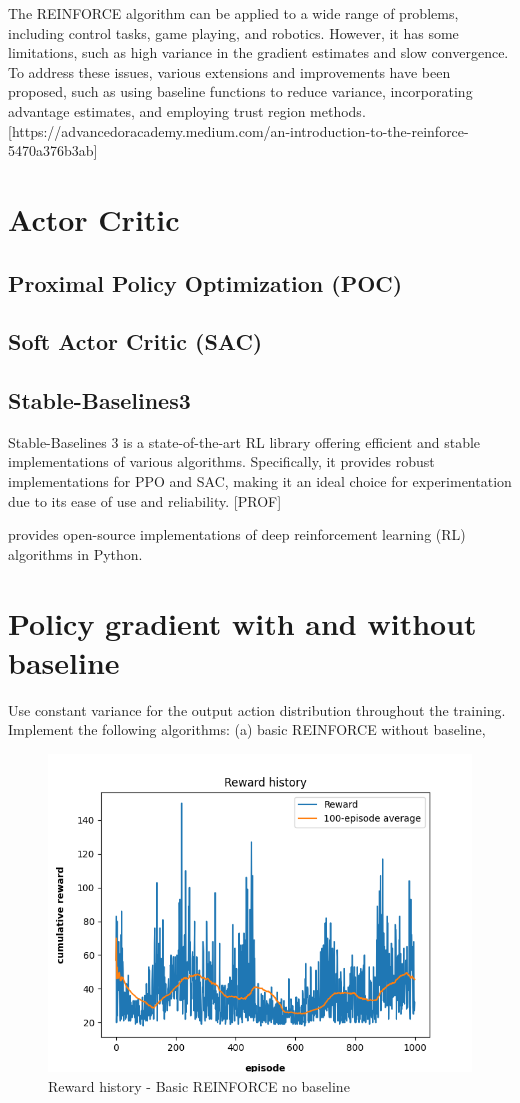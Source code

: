 \documentclass{article}
\begin{document}
The REINFORCE algorithm can be applied to a wide range of problems, including control tasks, game playing, and robotics. However, it has some limitations, such as high variance in the gradient estimates and slow convergence. To address these issues, various extensions and improvements have been proposed, such as using baseline functions to reduce variance, incorporating advantage estimates, and employing trust region methods.[https://advancedoracademy.medium.com/an-introduction-to-the-reinforce-5470a376b3ab]


\section{Actor Critic}

\subsection{Proximal Policy Optimization (POC)}

\subsection{Soft Actor Critic (SAC)}


\subsection{Stable-Baselines3}
Stable-Baselines 3 is a state-of-the-art RL library oﬀering eﬃcient and stable implementations of various
algorithms. Specifically, it provides robust implementations for PPO and SAC, making it an ideal choice for
experimentation due to its ease of use and reliability. [PROF]

provides open-source implementations of deep reinforcement learning
(RL) algorithms in Python. 

\section{Policy gradient with and without baseline}

Use constant variance for the output action distribution throughout the training.
Implement the following algorithms:
(a) basic REINFORCE without baseline,

\begin{figure}[h]
	\centering
	\includegraphics[width=0.5\linewidth]{../data/plot/reward_history_ContinuousCartPole-v0_0_basic.png}
	\caption{Reward history - Basic REINFORCE no baseline}
	\label{fig:plot3}
\end{figure}
\end{document}
